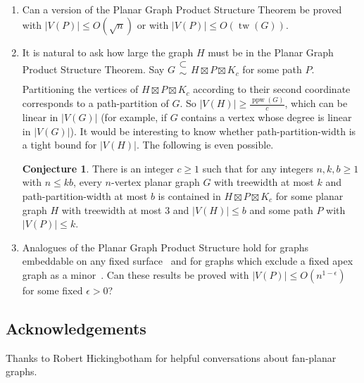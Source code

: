 \documentclass[11pt]{article}
\renewcommand{\geq}{\geqslant}
\renewcommand{\leq}{\leqslant}
\newcommand{\subsetsim}{\mathrel{\substack{\textstyle\subset\\[-0.3ex]\textstyle\sim\\[-0.4ex]}}}
\DeclareMathOperator{\tw}{tw}
\DeclareMathOperator{\ppw}{ppw}
\theoremstyle{plain}
\theoremstyle{definition}
\newtheorem{conj}[thm]{Conjecture}
\begin{document}
		\begin{enumerate}
			\item Can a version of the Planar Graph Product Structure Theorem be proved with $|V(P)|\leq O(\sqrt{n})$ or with $|V(P)|\leq O(\tw(G))$. 
			
			\item It is natural to ask how large the graph $H$ must be in the Planar Graph Product Structure Theorem. Say $G\subsetsim H\boxtimes P \boxtimes K_c$ for some path $P$. Partitioning the vertices of $H\boxtimes P\boxtimes K_c$ according to their second coordinate corresponds to a path-partition of $G$. So $|V(H)|\geq \frac{\ppw(G)}{c}$, which can be linear in $|V(G)|$ (for example, if $G$ contains a vertex whose degree is linear in $|V(G)|$). It would be interesting to know whether path-partition-width is a tight bound for $|V(H)|$. The following is even possible.
			
			\begin{conj}
					There is an integer $c\geq 1$ such that for any integers $n,k,b\geq 1$ with $n\leq kb$, every $n$-vertex planar graph $G$ with treewidth at most $k$ and path-partition-width at most $b$ is contained in $H \boxtimes P \boxtimes K_c$ for some planar graph $H$ with treewidth at most $3$ and $|V(H)|\leq b$ and some path $P$ with $|V(P)|\leq k$.
				\end{conj}
			
			
			\item Analogues of the Planar Graph Product Structure hold for graphs embeddable on any fixed surface~\citep{DJMMUW20,DHHW22} and for graphs which exclude a fixed apex graph as a minor~\citep{DJMMUW20,DHHJLMMRW}. Can these results be proved with $|V(P)|\leq O(n^{1-\epsilon})$ for some fixed $\epsilon>0$?
			
		\end{enumerate}
		
		\subsection*{Acknowledgements}
		
		Thanks to Robert Hickingbotham for helpful conversations about fan-planar graphs. 
		
		{
			\fontsize{10pt}{11pt}
			\selectfont
			
			
		}
	
\end{document}
